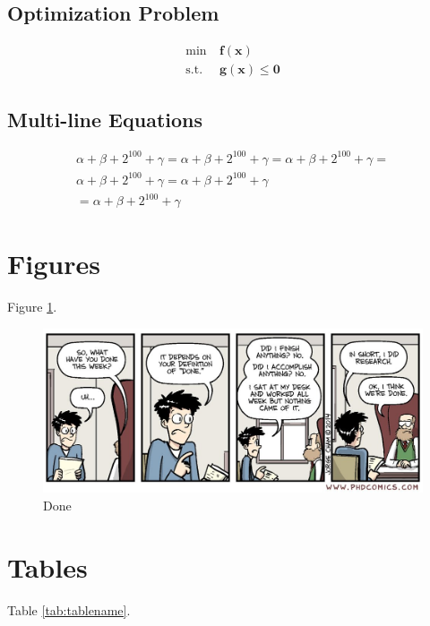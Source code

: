 \documentclass[letterpaper, 12pt, oneside]{book}
\theoremstyle{plain}
\theoremstyle{definition}
\theoremstyle{remark}
\begin{document}
\subsection{Optimization Problem} %
\label{sub:optimization_problem}
\begin{subequations}
\begin{align}
\min~& \bm{f}(\bm{x}) \\
\text{s.t.}~& \bm{g}(\bm{x}) \le \bm{0}
\end{align}
\end{subequations}

\subsection{Multi-line Equations} %
\label{sub:multi_line_equations}
\begin{multline}
\alpha+\beta+2^{100} + \gamma = \alpha+\beta+2^{100} + \gamma = \alpha+\beta+2^{100} + \gamma = \\
\alpha+\beta+2^{100} + \gamma = \alpha+\beta+2^{100} + \gamma \\
= \alpha+\beta+2^{100} + \gamma 
\end{multline}



\section{Figures} %
\label{sec:figures}
Figure \ref{fig:done}.

\begin{figure}[htbp]
  \centering
  \includegraphics[width=\linewidth]{done.jpg}
  \caption{Done}
  \label{fig:done}
\end{figure}

\lipsum[1]

\section{Tables} %
\label{sec:tables}
Table \ref{tab:tablename}.
\end{document}
